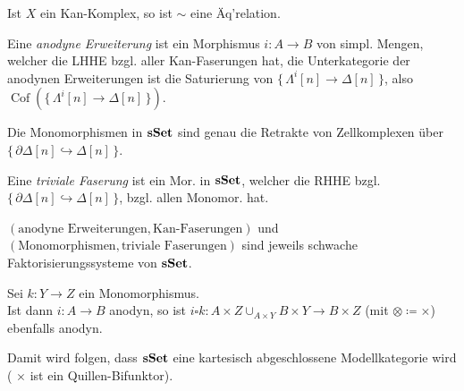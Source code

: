 \documentclass{cheat-sheet}
\DeclareMathOperator{\Coff}{Cof} %
\begin{document}
\begin{prop}
  Ist $X$ ein Kan-Komplex, so ist $\sim$ eine Äq'relation.
\end{prop}


\begin{defn}
  Eine \emph{anodyne Erweiterung} ist ein Morphismus $i : A \to B$ von simpl. Mengen, welcher die LHHE bzgl. aller Kan-Faserungen hat, \dh{} die Unterkategorie der anodynen Erweiterungen ist die Saturierung von $\{\, \Lambda^i[n] \to \Delta[n] \,\}$, also $\Coff(\{\, \Lambda^i[n] \to \Delta[n] \,\})$.
\end{defn}

\begin{satz}
  Die Monomorphismen in $\mathbf{sSet}$ sind genau die Retrakte von Zellkomplexen über $\{\, \partial \Delta[n] \hookrightarrow \Delta[n] \,\}$.
\end{satz}

\begin{defn}
  Eine \emph{triviale Faserung} ist ein Mor. in $\mathbf{sSet}$, welcher die RHHE bzgl. $\{\, \partial \Delta[n] \hookrightarrow \Delta[n] \,\}$, \dh{} bzgl. allen Monomor. hat.
\end{defn}

\begin{satz}
  $(\text{anodyne Erweiterungen}, \text{Kan-Faserungen})$ und $(\text{Monomorphismen}, \text{triviale Faserungen})$ sind jeweils schwache Faktorisierungssysteme von $\mathbf{sSet}$.
\end{satz}

\begin{satz}
  Sei $k : Y \to Z$ ein Monomorphismus. \\
  Ist dann $i : A \to B$ anodyn, so ist $i \square k : A \!\times\! Z \cup_{A \times Y} B \!\times\! Y \to B \!\times\! Z$ (mit ${\otimes} \coloneqq {\times}$) ebenfalls anodyn.
\end{satz}

\begin{bem}
  Damit wird folgen, dass $\mathbf{sSet}$ eine kartesisch abgeschlossene Modellkategorie wird (\dh{} $\times$ ist ein Quillen-Bifunktor).
\end{bem}

\end{document}
